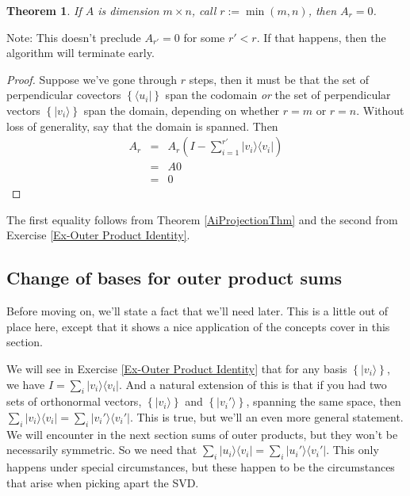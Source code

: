 \documentclass{amsbook}
\newtheorem{theorem}{Theorem}
\begin{document}
 \begin{theorem}
\label{SVDTerminates}
If $A$ is dimension $m\times n$, call $r:=\min(m,n)$, then $A_r=0$.
 \end{theorem}

Note:  This doesn't preclude $A_{r'}=0$ for some $r'<r$.  If that happens, then the algorithm will terminate early.

\begin{proof}
Suppose we've gone through $r$ steps, then it must be that the set of perpendicular covectors $\left\{\langle u _i|\right\}$ span the codomain {\em or} the set of perpendicular vectors $\left\{| v _i\rangle\right\}$ span the domain, depending on whether $r=m$ or $r=n$.  Without loss of generality, say that the domain is spanned.  Then 
$$
\begin{array}{rcl}
A_r&=&A_r\left(I-\sum_{i=1}^{r'}| v _i\rangle\langle v _i|\right)\\
&=&A0\\
&=&0
\end{array}
$$
\end{proof}

The first equality follows from Theorem \ref{AiProjectionThm} and the second from Exercise \ref{Ex-Outer Product Identity}.

\subsection{Change of bases for outer product sums}

Before moving on, we'll state a fact that we'll need later.  This is a little out of place here, except that it shows a nice application of the concepts cover in this section.

We will see in Exercise \ref{Ex-Outer Product Identity} that for any basis $\left\{|v_i\rangle\right\}$, we have $I=\sum_i|v_i\rangle\langle v_i|$.  And a natural extension of this is that if you had two sets of orthonormal vectors, $\left\{|v_i\rangle\right\}$ and $\left\{|v_i'\rangle\right\}$, spanning the same space, then $\sum_i|v_i\rangle\langle v_i|=\sum_i|v_i'\rangle\langle v_i'|$.  This is true, but we'll an even more general statement.  We will encounter in the next section sums of outer products, but they won't be necessarily symmetric.  So we need that $\sum_i|u_i\rangle\langle v_i|=\sum_i|u_i'\rangle\langle v_i'|$.  This only happens under special circumstances, but these happen to be the circumstances that arise when picking apart the SVD.
\end{document}
